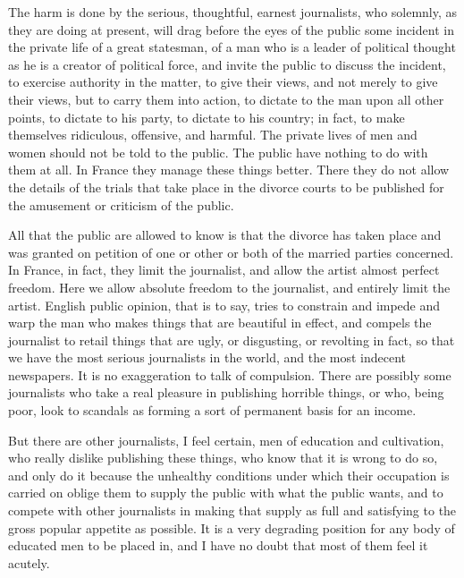 The harm is done by the serious, thoughtful, earnest journalists, who solemnly, as they are doing at present, will drag before the eyes of the public some incident in the private life of a great statesman, of a man who is a leader of political thought as he is a creator of political force, and invite the public to discuss the incident, to exercise authority in the matter, to give their views, and not merely to give their views, but to carry them into action, to dictate to the man upon all other points, to dictate to his party, to dictate to his country; in fact, to make themselves ridiculous, offensive, and harmful. The private lives of men and women should not be told to the public. The public have nothing to do with them at all. In France they manage these things better. There they do not allow the details of the trials that take place in the divorce courts to be published for the amusement or criticism of the public.\par

All that the public are allowed to know is that the divorce has taken place and was granted on petition of one or other or both of the married parties concerned. In France, in fact, they limit the journalist, and allow the artist almost perfect freedom. Here we allow absolute freedom to the journalist, and entirely limit the artist. English public opinion, that is to say, tries to constrain and impede and warp the man who makes things that are beautiful in effect, and compels the journalist to retail things that are ugly, or disgusting, or revolting in fact, so that we have the most serious journalists in the world, and the most indecent newspapers. It is no exaggeration to talk of compulsion. There are possibly some journalists who take a real pleasure in publishing horrible things, or who, being poor, look to scandals as forming a sort of permanent basis for an income.\par

But there are other journalists, I feel certain, men of education and cultivation, who really dislike publishing these things, who know that it is wrong to do so, and only do it because the unhealthy conditions under which their occupation is carried on oblige them to supply the public with what the public wants, and to compete with other journalists in making that supply as full and satisfying to the gross popular appetite as possible. It is a very degrading position for any body of educated men to be placed in, and I have no doubt that most of them feel it acutely.\par

